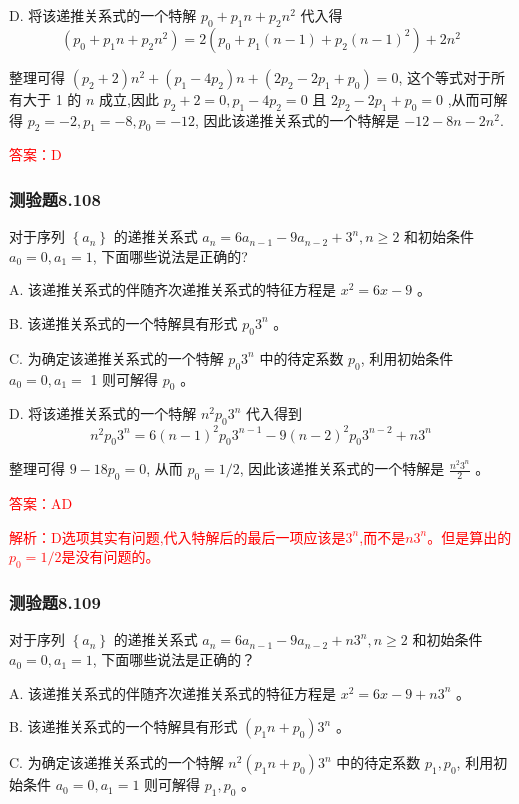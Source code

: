 \documentclass[UTF8, heading=true]{ctexart}
\begin{document}
D. 将该递推关系式的一个特解 $p_0+p_1 n+p_2 n^2$ 代入得
$$
\left(p_0+p_1 n+p_2 n^2\right)=2\left(p_0+p_1(n-1)+p_2(n-1)^2\right)+2 n^2
$$

整理可得 $\left(p_2+2\right) n^2+\left(p_1-4 p_2\right) n+\left(2 p_2-2 p_1+p_0\right)=0$, 这个等式对于所有大于 1 的 $n$ 成立,因此 $p_2+2=0, p_1-4 p_2=0$ 且 $2 p_2-2 p_1+p_0=0$ ,从而可解得 $p_2=-2, p_1=-8, p_0=-12$, 因此该递推关系式的一个特解是 $-12-8 n-2 n^2$.


\textcolor{red}{答案：D}

\subsubsection{测验题8.108}

对于序列 $\left\{a_n\right\}$ 的递推关系式 $a_n=6 a_{n-1}-9 a_{n-2}+3^n, n \geq 2$ 和初始条件 $a_0=0, a_1=1$, 下面哪些说法是正确的?

A. 该递推关系式的伴随齐次递推关系式的特征方程是 $x^2=6 x-9$ 。

B. 该递推关系式的一个特解具有形式 $p_0 3^n$ 。

C. 为确定该递推关系式的一个特解 $p_0 3^n$ 中的待定系数 $p_0$, 利用初始条件 $a_0=0, a_1=$ 1 则可解得 $p_0$ 。

D. 将该递推关系式的一个特解 $n^2 p_0 3^n$ 代入得到
$$
n^2 p_0 3^n=6(n-1)^2 p_0 3^{n-1}-9(n-2)^2 p_0 3^{n-2}+n 3^n
$$

整理可得 $9-18 p_0=0$, 从而 $p_0=1 / 2$, 因此该递推关系式的一个特解是 $\frac{n^2 3^n}{2}$ 。

\textcolor{red}{答案：AD}

\textcolor{red}{解析：D选项其实有问题,代入特解后的最后一项应该是$3^n$,而不是$n3^n$。但是算出的$p_0=1/2$是没有问题的。}


\subsubsection{测验题8.109}

对于序列 $\left\{a_n\right\}$ 的递推关系式 $a_n=6 a_{n-1}-9 a_{n-2}+n 3^n, n \geq 2$ 和初始条件 $a_0=0, a_1=1$, 下面哪些说法是正确的？

A. 该递推关系式的伴随齐次递推关系式的特征方程是 $x^2=6 x-9+n 3^n$ 。

B. 该递推关系式的一个特解具有形式 $\left(p_1 n+p_0\right) 3^n$ 。

C. 为确定该递推关系式的一个特解 $n^2\left(p_1 n+p_0\right) 3^n$ 中的待定系数 $p_1, p_0$, 利用初始条件 $a_0=0, a_1=1$ 则可解得 $p_1, p_0$ 。
\end{document}
